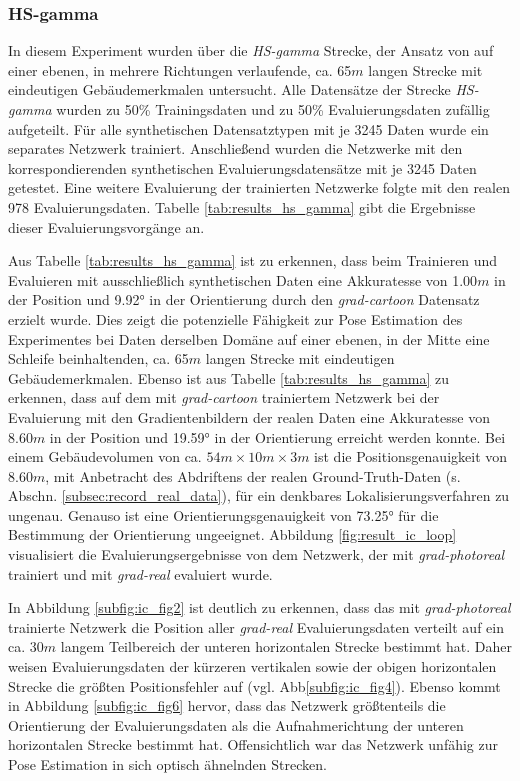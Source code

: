 \subsubsection{HS-gamma}



In diesem Experiment wurden über die \textit{HS-gamma} Strecke, der Ansatz von \citet{acharyaBIMPoseNetIndoorCamera2019} auf einer ebenen, in mehrere Richtungen verlaufende, ca. 65$m$ langen Strecke mit eindeutigen Gebäudemerkmalen untersucht. Alle Datensätze der Strecke \textit{HS-gamma} wurden zu 50\% Trainingsdaten und zu 50\% Evaluierungsdaten zufällig aufgeteilt. Für alle synthetischen Datensatztypen mit je 3245 Daten wurde ein separates Netzwerk trainiert. Anschließend wurden die Netzwerke mit den korrespondierenden synthetischen Evaluierungsdatensätze mit je 3245 Daten getestet. Eine weitere Evaluierung der trainierten Netzwerke folgte mit den realen 978 Evaluierungsdaten. Tabelle \ref{tab:results_hs_gamma} gibt die Ergebnisse dieser Evaluierungsvorgänge an.

Aus Tabelle \ref{tab:results_hs_gamma} ist zu erkennen, dass beim Trainieren und Evaluieren mit ausschließlich synthetischen Daten eine Akkuratesse von 1.00$m$ in der Position und 9.92° in der Orientierung  durch den \textit{grad-cartoon} Datensatz erzielt wurde. Dies zeigt die potenzielle Fähigkeit zur Pose Estimation des Experimentes bei Daten derselben Domäne auf einer ebenen, in der Mitte eine Schleife beinhaltenden, ca. 65$m$ langen Strecke mit eindeutigen Gebäudemerkmalen. Ebenso ist aus Tabelle \ref{tab:results_hs_gamma} zu erkennen, dass auf dem mit \textit{grad-cartoon} trainiertem Netzwerk bei der Evaluierung mit den Gradientenbildern der realen Daten eine Akkuratesse von 8.60$m$ in der Position und 19.59° in der Orientierung erreicht werden konnte. Bei einem Gebäudevolumen von ca. $54m \times 10m \times 3m$ ist die Positionsgenauigkeit von 8.60$m$, mit Anbetracht des Abdriftens der realen Ground-Truth-Daten (s. Abschn. \ref{subsec:record_real_data}), für ein denkbares Lokalisierungsverfahren zu ungenau. Genauso ist eine Orientierungsgenauigkeit von 73.25° für die Bestimmung der Orientierung ungeeignet. Abbildung \ref{fig:result_ic_loop} visualisiert die Evaluierungsergebnisse von dem Netzwerk, der mit \textit{grad-photoreal} trainiert und mit \textit{grad-real} evaluiert wurde.

In Abbildung \ref{subfig:ic_fig2} ist deutlich zu erkennen, dass das mit \textit{grad-photoreal} trainierte Netzwerk die Position aller \textit{grad-real} Evaluierungsdaten verteilt auf ein ca. 30$m$ langem Teilbereich der unteren horizontalen Strecke bestimmt hat. Daher weisen Evaluierungsdaten der kürzeren vertikalen sowie der obigen horizontalen Strecke die größten Positionsfehler auf (vgl. Abb\ref{subfig:ic_fig4}). Ebenso kommt in Abbildung \ref{subfig:ic_fig6} hervor, dass das Netzwerk größtenteils die Orientierung der Evaluierungsdaten als die Aufnahmerichtung der unteren horizontalen Strecke bestimmt hat. Offensichtlich war das Netzwerk unfähig zur Pose Estimation in sich optisch ähnelnden Strecken.


